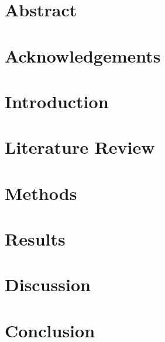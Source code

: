 \documentclass[a4paper]{book}
\begin{document}
\chapter{Abstract}

\chapter{Acknowledgements}

\tableofcontents

\chapter{Introduction}

\chapter{Literature Review}

\chapter{Methods}

\chapter{Results}

\chapter{Discussion}

\chapter{Conclusion}



\end{document}
